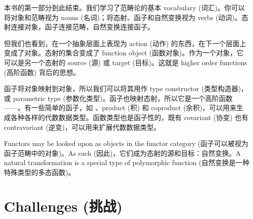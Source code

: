 本书的第一部分到此结束。我们学习了范畴论的基本 vocabulary (词汇)。你可以将对象和范畴视为 nouns (名词)；将态射、函子和自然变换视为 verbs (动词)。态射连接对象，函子连接范畴，自然变换连接函子。

但我们也看到，在一个抽象层面上表现为 action (动作) 的东西，在下一个层面上变成了对象。态射的集合变成了 function object (函数对象)。作为一个对象，它可以是另一个态射的 source (源) 或 target (目标)。这就是 higher order functions (高阶函数) 背后的思想。

函子将对象映射到对象，所以我们可以将其用作 type constructor (类型构造器)，或 parametric type (参数化类型)。函子也映射态射，所以它是一个高阶函数——。有一些简单的函子，如 、product (积) 和 coproduct (余积)，可以用来生成各种各样的代数数据类型。函数类型也是函子性的，既有 covariant (协变) 也有 contravariant (逆变)，可以用来扩展代数数据类型。

Functors may be looked upon as objects in the functor category (函子可以被视为函子范畴中的对象)。As such (因此)，它们成为态射的源和目标：自然变换。A natural transformation is a special type of polymorphic function (自然变换是一种特殊类型的多态函数)。

\section{Challenges (挑战)}

